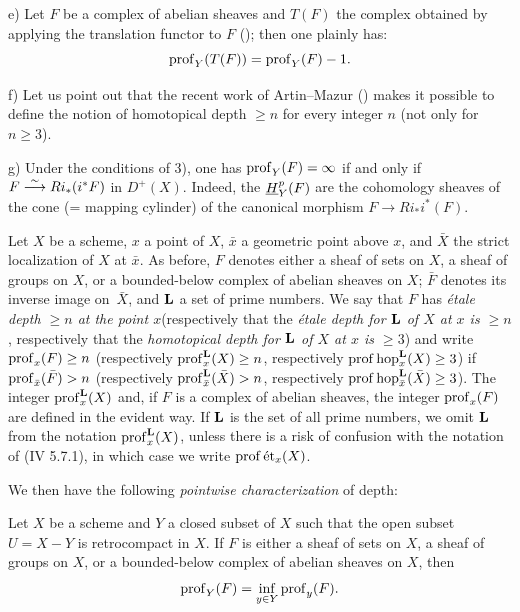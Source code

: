 \begin{remarques}
e) Let $F$ be a complex of abelian sheaves and $T(F)$ the complex obtained by applying the translation functor to $F$ (\cite{XIV.3}); then one plainly has:
$$
\prof_Y(T(F))=\prof_Y(F)-1.
$$

f) Let us point out that the recent work of Artin--Mazur (\cite{XIV.1}) makes it possible to define the notion of homotopical depth $\geq n$ for every integer $n$ (not only for $n\geq 3$).

g) Under the conditions of  3), one has $\prof_Y(F)=\infty$ if and only if $F\isomto Ri_*(i^*F)$ in $D^+(X)$. Indeed, the ${\h}_Y^p(F)$ are the cohomology sheaves of the cone (= mapping cylinder) of the canonical morphism $F\to Ri_*i^*(F)$.
\end{remarques}

\begin{definition} \label{XIV.1.7}
Let $X$ be a scheme, $x$ a point of $X$, $\bar x$ a geometric point above $x$, and $\bar X$ the strict localization of $X$ at $\bar x$. As before, $F$ denotes either a sheaf of sets on $X$, a sheaf of groups on $X$, or a bounded-below complex of abelian sheaves on $X$; $\bar F$ denotes its inverse image on~$\bar X$, and $\LL$ a set of prime numbers. We say that $F$ has \emph{étale depth $\geq n$ at the point $x$}\pageoriginale (respectively that the \emph{étale depth for $\LL$ of $X$ at $x$ is $\geq n$}, respectively that the \emph{homotopical depth for $\LL$ of $X$ at $x$ is $\geq 3$}) and write $\prof_x(F)\geq n$ (respectively $\prof_x^{\LL}(X)\geq n$, respectively $\prof \hop_x^{\LL}(X)\geq \sisi{3}{3}$) if $\prof_{\bar x}(\bar F)>n$ (respectively $\prof_{\bar x}^{\LL}(\bar X)>\nobreak n$, respectively $\prof \hop_{\bar x}^{\LL}(\bar X)\geq \sisi{3}{3}$). The integer $\prof_x^{\LL}(X)$ and, if $F$ is a complex of abelian sheaves, the integer $\prof_x(F)$ are defined in the evident way. If $\LL$ is the set of all prime numbers, we omit $\LL$ from the notation $\prof_x^{\LL}(X)$, unless there is a risk of confusion with the notation of \textup{(\EGA IV 5.7.1)}, in which case we write $\prof \et_x(X)$.
\end{definition}

We then have the following \textit{pointwise characterization} of depth:

\begin{theoreme} \label{XIV.1.8} Let $X$ be a scheme and $Y$ a closed subset of $X$ such that the open subset $U=X-Y$ is retrocompact in $X$. If $F$ is either a sheaf of sets on $X$, a sheaf of groups on $X$, or a bounded-below complex of abelian sheaves on $X$, then
$$
\prof_Y(F)=\inf_{y\in Y} \prof_y(F).
$$
\end{theoreme}

